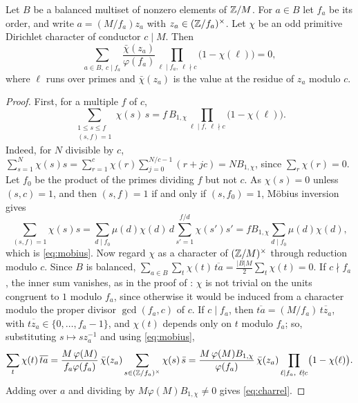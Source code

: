\begin{lemma}\label{lem:charrel}
Let $B$ be a balanced multiset of nonzero elements of $\mathbb{Z}/M$. For $a\in B$
let $f_{a}$ be its order, and write $a=(M/f_{a})z_{a}$ with
$z_{a}\in(\mathbb{Z}/f_{a})^{\times}$. Let $\chi$ be an odd primitive Dirichlet
character of conductor $c\mid M$. Then
\begin{equation}\label{eq:charrel}
  \sum_{a\in B,\ c\mid f_{a}}\frac{\bar\chi(z_{a})}{\varphi(f_{a})}
  \prod_{\ell\mid f_{a},\ \ell\nmid c}\bigl(1-\chi(\ell)\bigr)=0,
\end{equation}
where $\ell$ runs over primes and $\bar\chi(z_{a})$ is the value at the
residue of $z_{a}$ modulo $c$.
\end{lemma}

\begin{proof}
First, for a multiple $f$ of $c$,
\begin{equation}\label{eq:mobius}
  \sum_{\substack{1\le s\le f\\ (s,f)=1}}\chi(s)\,s=f\,B_{1,\chi}
  \prod_{\ell\mid f,\ \ell\nmid c}\bigl(1-\chi(\ell)\bigr).
\end{equation}
Indeed, for $N$ divisible by $c$, $\sum_{s=1}^{N}\chi(s)s=\sum_{r=1}^{c}
\chi(r)\sum_{j=0}^{N/c-1}(r+jc)=NB_{1,\chi}$, since $\sum_{r}\chi(r)=0$. Let
$f_{0}$ be the product of the primes dividing $f$ but not $c$. As $\chi(s)=0$
unless $(s,c)=1$, and then $(s,f)=1$ if and only if $(s,f_{0})=1$, M\"obius
inversion gives
\[
  \sum_{(s,f)=1}\chi(s)s=\sum_{d\mid f_{0}}\mu(d)\chi(d)\,d\sum_{s'=1}^{f/d}
  \chi(s')s'=fB_{1,\chi}\sum_{d\mid f_{0}}\mu(d)\chi(d),
\]
which is \eqref{eq:mobius}. Now regard $\chi$ as a character of
$(\mathbb{Z}/M)^{\times}$ through reduction modulo $c$. Since $B$ is balanced,
$\sum_{a\in B}\sum_{t}\chi(t)\,\overline{ta}=\frac{|B|M}{2}\sum_{t}\chi(t)=0$.
If $c\nmid f_{a}$, the inner sum vanishes, as in the proof of
: $\chi$ is not trivial on the units congruent to $1$
modulo $f_{a}$, since otherwise it would be induced from a character modulo
the proper divisor $\gcd(f_{a},c)$ of $c$. If $c\mid f_{a}$, then
$\overline{ta}=(M/f_{a})\,\overline{tz_{a}}$, with $\overline{tz_{a}}\in
\{0,\dots,f_{a}-1\}$, and $\chi(t)$ depends only on $t$ modulo $f_{a}$; so,
substituting $s\mapsto sz_{a}^{-1}$ and using \eqref{eq:mobius},
\[
  \sum_{t}\chi(t)\,\overline{ta}=\frac{M\,\varphi(M)}{f_{a}\varphi(f_{a})}
  \,\bar\chi(z_{a})\sum_{s\in(\mathbb{Z}/f_{a})^{\times}}\chi(s)\,\bar s
  =\frac{M\,\varphi(M)B_{1,\chi}}{\varphi(f_{a})}\,\bar\chi(z_{a})
  \prod_{\ell\mid f_{a},\ \ell\nmid c}\bigl(1-\chi(\ell)\bigr).
\]
Adding over $a$ and dividing by $M\varphi(M)B_{1,\chi}\ne0$ gives
\eqref{eq:charrel}.
\end{proof}

